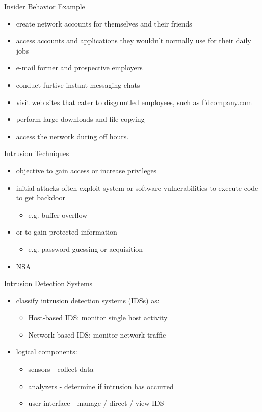 \documentclass{beamer}
\begin{document}
\begin{frame}{Insider Behavior Example}
  \begin{itemize}
  \item create network accounts for themselves and their 
    friends
  \item access accounts and applications they wouldn't 
    normally use for their daily jobs
  \item e-mail former and prospective employers
  \item conduct furtive instant-messaging chats
  \item visit web sites that cater to disgruntled 
    employees, such as f'dcompany.com
  \item perform large downloads and ﬁle copying
  \item access the network during off hours.
  \end{itemize}
\end{frame}

\begin{frame}{Intrusion Techniques}
  \begin{itemize}
  \item objective to gain access or increase privileges
  \item initial attacks often exploit system or software 
    vulnerabilities to execute code to get backdoor
      \begin{itemize}
      \item e.g. buffer overflow 
      \end{itemize}
  \item or to gain protected information 
      \begin{itemize}
      \item e.g. password guessing or acquisition
      \end{itemize}
    \item NSA
  \end{itemize}
\end{frame}


\begin{frame}{Intrusion Detection Systems}
  \begin{itemize}
    \item classify intrusion detection systems (IDSs) as:
      \begin{itemize}
      \item Host-based IDS: monitor single host activity
      \item Network-based IDS: monitor network trafﬁc
      \end{itemize}
    \item logical components:
      \begin{itemize}
      \item sensors - collect data
      \item analyzers - determine if intrusion has occurred
      \item user interface - manage / direct / view IDS
      \end{itemize}
  \end{itemize}
\end{frame}
\end{document}
